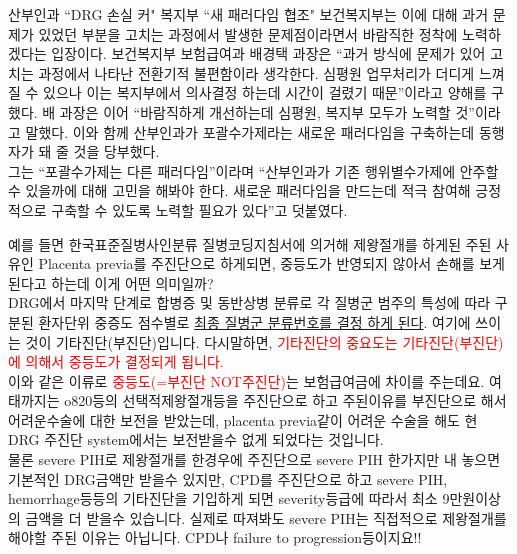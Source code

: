 \begin{hemphsentense}{산부인과 ``DRG 손실 커" 복지부 ``새 패러다임 협조"}
보건복지부는 이에 대해 과거 문제가 있었던 부분을 고치는 과정에서 발생한 문제점이라면서 바람직한 정착에 노력하겠다는 입장이다. 보건복지부 보험급여과 배경택 과장은 “과거 방식에 문제가 있어 고치는 과정에서 나타난 전환기적 불편함이라 생각한다. 심평원 업무처리가 더디게 느껴질 수 있으나 이는 복지부에서 의사결정 하는데 시간이 걸렸기 때문”이라고 양해를 구했다. 배 과장은 이어 “바람직하게 개선하는데 심평원, 복지부 모두가 노력할 것”이라고 말했다. 이와 함께 산부인과가 포괄수가제라는 새로운 패러다임을 구축하는데 동행자가 돼 줄 것을 당부했다.\\
그는 “포괄수가제는 다른 패러다임”이라며 “산부인과가 기존 행위별수가제에 안주할 수 있을까에 대해 고민을 해봐야 한다. 새로운 패러다임을 만드는데 적극 참여해 긍정적으로 구축할 수 있도록 노력할 필요가 있다”고 덧붙였다.
\end{hemphsentense}
예를 들면 한국표준질병사인분류 질병코딩지침서에 의거해 제왕절개를 하게된 주된 사유인 Placenta previa를 주진단으로 하게되면, 중등도가 반영되지 않아서 손해를 보게된다고 하는데 이게 어떤 의미일까? \\ DRG에서 마지막 단계로 합병증 및 동반상병 분류로 각 질병군 범주의 특성에 따라 구분된 환자단위 중증도 점수별로 \uline{최종 질병군 분류번호를 결정 하게 된다}. 여기에 쓰이는 것이 기타진단(부진단)입니다. 다시말하면, \textcolor{red}{기타진단의 중요도는 기타진단(부진단)에 의해서 중등도가 결정되게 됩니다.}\\
이와 같은 이류로 \textcolor{red}{중등도(=부진단 NOT주진단)}는 보험급여금에 차이를 주는데요. 여태까지는 o820등의 선택적제왕절개등을 주진단으로 하고 주된이유를 부진단으로 해서 어려운수술에 대한 보전을 받았는데, placenta previa같이 어려운 수술을 해도 현 DRG 주진단 system에서는 보전받을수 없게 되었다는 것입니다. \\
물론 severe PIH로 제왕절개를 한경우에 주진단으로 severe PIH 한가지만 내 놓으면 기본적인 DRG금액만 받을수 있지만, CPD를 주진단으로 하고 severe PIH, hemorrhage등등의 기타진단을 기입하게 되면 severity등급에 따라서 최소 9만원이상의 금액을 더 받을수 있습니다. 실제로 따져봐도 severe PIH는 직접적으로 제왕절개를 해야할 주된 이유는 아닙니다. CPD나 failure to progression등이지요!!\\
\prezi{\clearpage}


